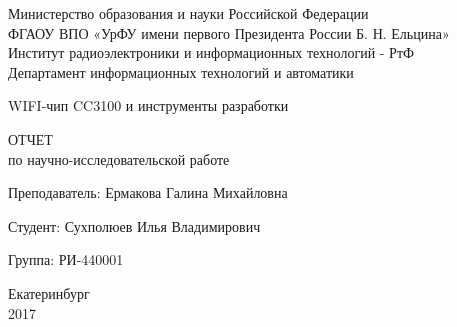 \begin{center}
    Министерство образования и науки Российской Федерации\\
    ФГАОУ ВПО  «УрФУ имени первого Президента России Б. Н. Ельцина»\\
    Институт радиоэлектроники и информационных технологий - РтФ\\
    Департамент информационных технологий и автоматики
    \par
    \vspace{4.5cm}
    \Large{
      WIFI-чип CC3100 и инструменты разработки

      \par
      \vspace{0.5cm}

      ОТЧЕТ\\
      по научно-исследовательской работе
    }

    \vspace{4cm}
    {
      Преподаватель: \hfill Ермакова Галина Михайловна
    }
    \par
    {
      Студент: \hfill Сухполюев Илья Владимирович
    }
    \par
    {
      Группа: \hfill РИ-440001
    }

    \par
    \vspace{3.5cm}
    Екатеринбург\\
    2017
\end{center}

